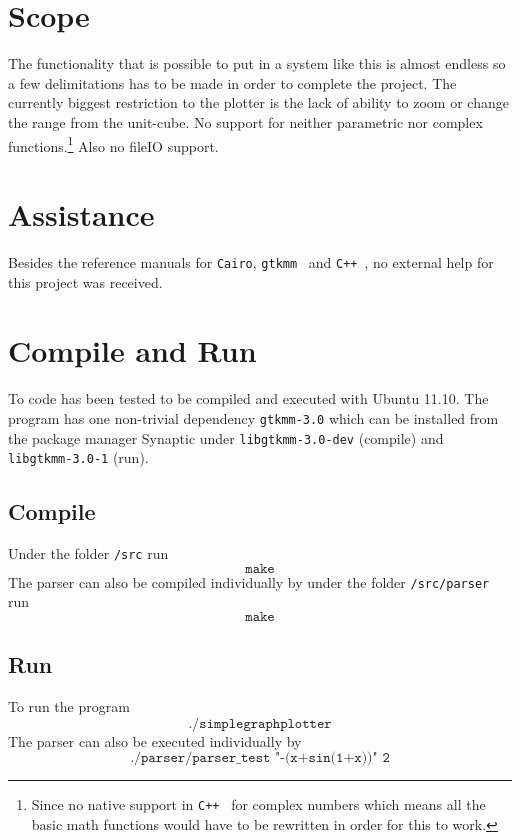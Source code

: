 \documentclass[a4paper,11pt]{kth-mag}
\newcommand{\Cpp}{\texttt{C++}}
\newcommand{\Gtkmm}{\texttt{gtkmm}}
\newcommand{\Cairo}{\texttt{Cairo}}
\begin{document}
\section{Scope}
\label{sec:scope}
The functionality that is possible to put in a system like this is
almost endless so a few delimitations has to be made in order to complete the project.
The currently biggest restriction to the plotter is the lack of 
ability to zoom or change the range from the unit-cube.
No support for neither parametric nor complex functions.\footnote{
Since no native support in \Cpp~ for complex numbers which means 
all the basic math functions would have to be rewritten in order for this to work.}
Also no fileIO support.
\section{Assistance}
Besides the reference manuals for \Cairo, \Gtkmm~ and \Cpp~, no external help for 
this project was received.

\section{Compile and Run}
To code has been tested to be compiled and executed with Ubuntu 11.10. 
The program has one non-trivial dependency \Gtkmm\texttt{-3.0} which can be
installed from the package manager Synaptic under 
\texttt{libgtkmm-3.0-dev} (compile) 
and
\texttt{libgtkmm-3.0-1} (run).
\subsection{Compile}
Under the folder \texttt{/src} run
\begin{equation*}
   \texttt{make} 
\end{equation*}
The parser can also be compiled individually by under the folder
\texttt{/src/parser} run 
\begin{equation*}
   \texttt{make} 
\end{equation*}
\subsection{Run}
To run the program 
\begin{equation*}
   \texttt{./simplegraphplotter} 
\end{equation*}
The parser can also be executed individually by 
\begin{equation*}
    \texttt{./parser/parser\_test "-(x+sin(1+x))" 2}
\end{equation*}
\end{document}
